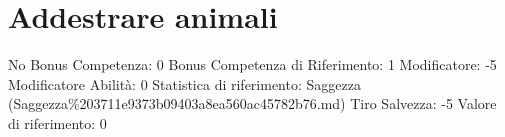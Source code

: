 \section{Addestrare animali}\label{addestrare-animali}

\begin{description}
\tightlist
\item[Tags: ABI]
No Bonus Competenza: 0 Bonus Competenza di Riferimento: 1 Modificatore:
-5 Modificatore Abilità: 0 Statistica di riferimento: Saggezza
(Saggezza\%203711e9373b09403a8ea560ac45782b76.md) Tiro Salvezza: -5
Valore di riferimento: 0
\end{description}
